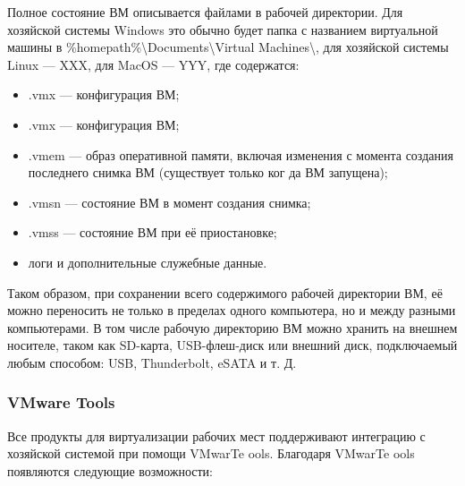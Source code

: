 \documentclass[14pt, a4paper]{article}
\begin{document}
Полное состояние ВМ описывается файлами в рабочей директории. Для хозяйской системы Windows
это обычно будет папка с названием виртуальной машины в \colorbox{backcolour}{\%homepath\%{\textbackslash}Documents{\textbackslash}Virtual Machines\textbackslash}, для хозяйской системы Linux — XXX, для MacOS — YYY, где содержатся:

\begin{itemize}
    \item .vmx — конфигурация ВМ;
    \item .vmx — конфигурация ВМ;
    \item .vmem — образ оперативной памяти, включая изменения с момента создания последнего
    снимка ВМ (существует только ког да ВМ запущена);
    \item .vmsn — состояние ВМ в момент создания снимка;
    \item .vmss — состояние ВМ при её приостановке;
    \item логи и дополнительные служебные данные.
\end{itemize}

Таком образом, при сохранении всего содержимого рабочей директории ВМ, её можно переносить не
только в пределах одного компьютера, но и между разными компьютерами. В том числе рабочую
директорию ВМ можно хранить на внешнем носителе, таком как SD-карта, USB-флеш-диск или
внешний диск, подключаемый любым способом: USB, Thunderbolt, eSATA и т. Д.

\subsubsection*{VMware Tools}

Все продукты для виртуализации рабочих мест поддерживают интеграцию с хозяйской системой при
помощи VMwarTe ools. Благодаря VMwarTe ools появляются следующие возможности:
\end{document}
